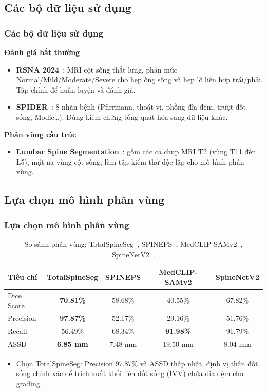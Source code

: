 \documentclass{beamer}
\numberwithin{figure}{section}
\numberwithin{table}{section}
\begin{document}
\subsection{Các bộ dữ liệu sử dụng}
\begin{frame}
\frametitle{Các bộ dữ liệu sử dụng}
\textbf{Đánh giá bất thường}
\begin{itemize}\small
    \item[--] \textbf{RSNA 2024}~\cite{rsna2024dataset}: MRI cột sống thắt lưng, phân mức Normal/Mild/Moderate/Severe cho hẹp ống sống và hẹp lỗ liên hợp trái/phải. Tập chính để huấn luyện và đánh giá.
    \item[--] \textbf{SPIDER}~\cite{vansluijs2022spider}: 8 nhãn bệnh (Pfirrmann, thoát vị, phồng đĩa đệm, trượt đốt sống, Modic\ldots). Dùng kiểm chứng tổng quát hóa sang dữ liệu khác.
\end{itemize}
\vspace{0.3em}
\textbf{Phân vùng cấu trúc}
\begin{itemize}\small
    \item[--] \textbf{Lumbar Spine Segmentation}~\cite{chu2015dataset}: gồm các ca chụp MRI T2 (vùng T11 đến L5), mặt nạ vùng cột sống; làm tập kiểm thử độc lập cho mô hình phân vùng.
\end{itemize}
\end{frame}

\subsection{Lựa chọn mô hình phân vùng}
\begin{frame}
\frametitle{Lựa chọn mô hình phân vùng}
\begin{table}
\centering
\small
\begin{tabular}{lcccc}
\toprule
\textbf{Tiêu chí} & \textbf{TotalSpineSeg} & \textbf{SPINEPS} & \textbf{MedCLIP-SAMv2} & \textbf{SpineNetV2} \\
\midrule
Dice Score & \textbf{70.81\%} & 58.68\% & 40.55\% & 67.82\% \\
Precision  & \textbf{97.87\%} & 52.17\% & 29.16\% & 51.76\% \\
Recall     & 56.49\% & 68.34\% & \textbf{91.98\%} & 91.79\% \\
ASSD       & \textbf{6.85 mm} & 7.48 mm & 19.50 mm & 8.04 mm \\
\bottomrule
\end{tabular}
\caption{So sánh phân vùng: TotalSpineSeg~\cite{warszawer2025totalspineseg}, SPINEPS~\cite{moller2024spineps}, MedCLIP-SAMv2~\cite{koleilat2025medclipsamv2}, SpineNetV2~\cite{windsor2022spinenetv2}.}
\end{table}
\begin{itemize}
    \item[$\rightarrow$] Chọn TotalSpineSeg: Precision 97.87\% và ASSD thấp nhất, định vị thân đốt sống chính xác để trích xuất khối liên đốt sống (IVV) chứa đĩa đệm cho grading.
\end{itemize}
\end{frame}
\end{document}
